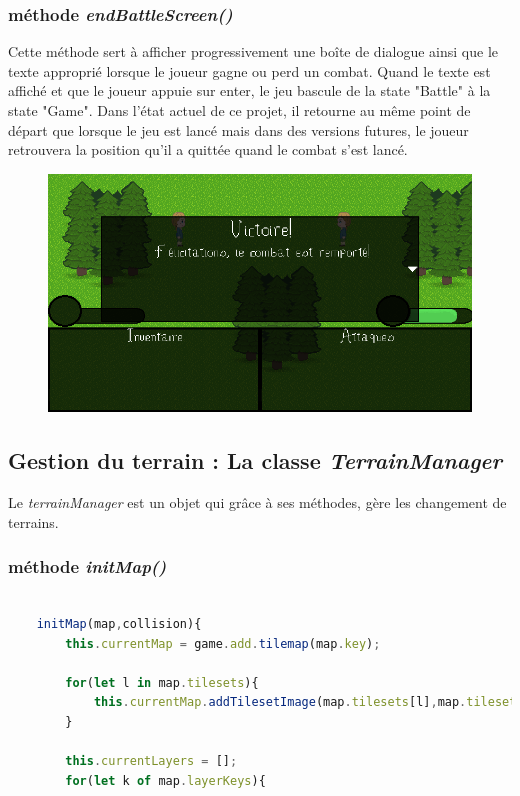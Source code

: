 \documentclass[11pt]{article}
\begin{document}
\begin{appendices}
\subsubsection{méthode \textit{endBattleScreen()}}
Cette méthode sert à afficher progressivement une boîte de dialogue ainsi que le texte approprié lorsque le joueur gagne ou perd un combat. Quand le texte est affiché et que le joueur appuie sur enter, le jeu bascule de la state "Battle" à la state "Game". Dans l'état actuel de ce projet, il retourne au même point de départ que lorsque le jeu est lancé mais dans des versions futures, le joueur retrouvera la position qu'il a quittée quand le combat s'est lancé.\\
\begin{figure}[H]
\includegraphics[scale=0.35]{victoire}
\centering
\end{figure}
\subsection{Gestion du terrain : La classe \textit{TerrainManager}}
Le \textit{terrainManager} est un objet qui grâce à ses méthodes, gère les changement de terrains.
\subsubsection{méthode \textit{initMap()}}
\begin{lstlisting}[language=JavaScript]

    initMap(map,collision){ 
        this.currentMap = game.add.tilemap(map.key);

        for(let l in map.tilesets){
            this.currentMap.addTilesetImage(map.tilesets[l],map.tilesets[l]); 
        }

        this.currentLayers = [];
        for(let k of map.layerKeys){


\end{lstlisting}
\end{appendices}
\end{document}
